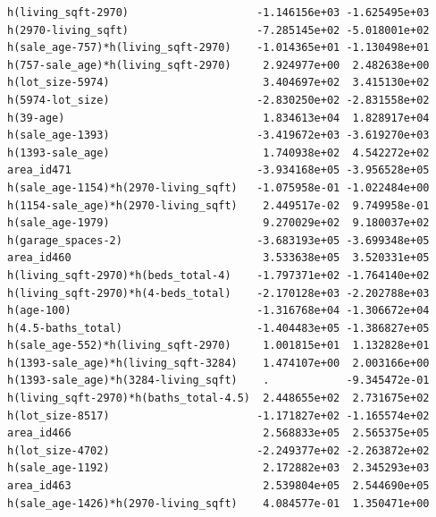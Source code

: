 \documentclass[
]{article}
\begin{document}
\begin{verbatim}
h(living_sqft-2970)                    -1.146156e+03 -1.625495e+03
h(2970-living_sqft)                    -7.285145e+02 -5.018001e+02
h(sale_age-757)*h(living_sqft-2970)    -1.014365e+01 -1.130498e+01
h(757-sale_age)*h(living_sqft-2970)     2.924977e+00  2.482638e+00
h(lot_size-5974)                        3.404697e+02  3.415130e+02
h(5974-lot_size)                       -2.830250e+02 -2.831558e+02
h(39-age)                               1.834613e+04  1.828917e+04
h(sale_age-1393)                       -3.419672e+03 -3.619270e+03
h(1393-sale_age)                        1.740938e+02  4.542272e+02
area_id471                             -3.934168e+05 -3.956528e+05
h(sale_age-1154)*h(2970-living_sqft)   -1.075958e-01 -1.022484e+00
h(1154-sale_age)*h(2970-living_sqft)    2.449517e-02  9.749958e-01
h(sale_age-1979)                        9.270029e+02  9.180037e+02
h(garage_spaces-2)                     -3.683193e+05 -3.699348e+05
area_id460                              3.533638e+05  3.520331e+05
h(living_sqft-2970)*h(beds_total-4)    -1.797371e+02 -1.764140e+02
h(living_sqft-2970)*h(4-beds_total)    -2.170128e+03 -2.202788e+03
h(age-100)                             -1.316768e+04 -1.306672e+04
h(4.5-baths_total)                     -1.404483e+05 -1.386827e+05
h(sale_age-552)*h(living_sqft-2970)     1.001815e+01  1.132828e+01
h(1393-sale_age)*h(living_sqft-3284)    1.474107e+00  2.003166e+00
h(1393-sale_age)*h(3284-living_sqft)    .            -9.345472e-01
h(living_sqft-2970)*h(baths_total-4.5)  2.448655e+02  2.731675e+02
h(lot_size-8517)                       -1.171827e+02 -1.165574e+02
area_id466                              2.568833e+05  2.565375e+05
h(lot_size-4702)                       -2.249377e+02 -2.263872e+02
h(sale_age-1192)                        2.172882e+03  2.345293e+03
area_id463                              2.539804e+05  2.544690e+05
h(sale_age-1426)*h(2970-living_sqft)    4.084577e-01  1.350471e+00
                                                                  

\end{verbatim}
\end{document}
